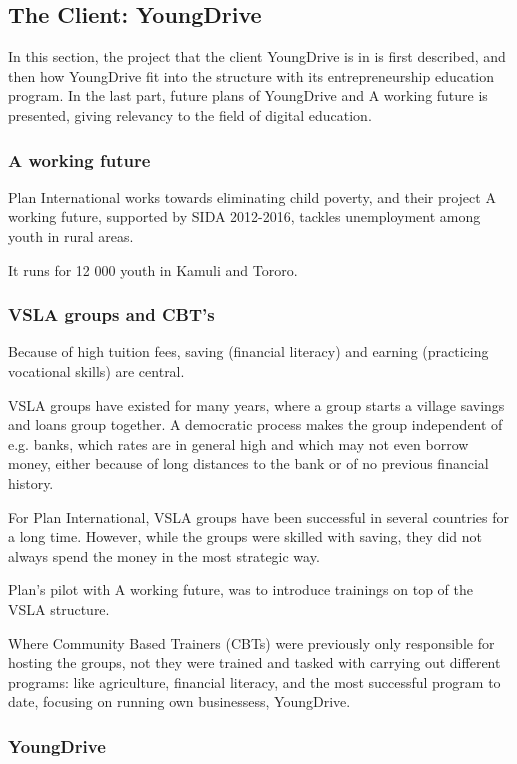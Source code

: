\subsection{The Client: YoungDrive}

In this section, the project that the client YoungDrive is in is first described, and then how YoungDrive  fit into the structure with its entrepreneurship education program. In the last part, future plans of YoungDrive and A working future is presented, giving relevancy to the field of digital education.

\subsubsection{A working future}

Plan International works towards eliminating child poverty, and their project A working future, supported by SIDA 2012-2016, tackles unemployment among youth in rural areas.

It runs for 12 000 youth in Kamuli and Tororo.

\subsubsection{VSLA groups and CBT's}

Because of high tuition fees, saving (financial literacy) and earning (practicing vocational skills) are central.

VSLA groups have existed for many years, where a group starts a village savings and loans group together. A democratic process makes the group independent of e.g. banks, which rates are in general high and which may not even borrow money, either because of long distances to the bank or of no previous financial history.

For Plan International, VSLA groups have been successful in several countries for a long time. However, while the groups were skilled with saving, they did not always spend the money in the most strategic way.

Plan's pilot with A working future, was to introduce trainings on top of the VSLA structure.

Where Community Based Trainers (CBTs) were previously only responsible for hosting the groups, not they were trained and tasked with carrying out different programs: like agriculture, financial literacy, and the most successful program to date, focusing on running own businessess, YoungDrive.

\subsubsection{YoungDrive}

